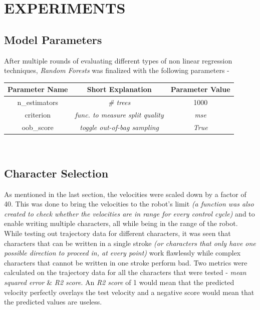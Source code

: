 \documentclass[a4paper]{article}
\begin{document}
\bigskip

\section{EXPERIMENTS}
\subsection{Model Parameters}
After multiple rounds of evaluating different types of non linear regression techniques, {\it Random Forests} was finalized with the following parameters -
\\
\begin{center}
 \begin{tabular}{| c | c | c |} 
 \hline
 \textbf{Parameter Name} & \textbf{Short Explanation} & \textbf{Parameter Value} \\ [0.5ex] 
 \hline
 n\_estimators & {\it \# trees} & 1000  \\ 
 \hline
 criterion & {\it func. to measure split quality} & {\it mse} \\
 \hline
 oob\_score & {\it toggle out-of-bag sampling} & {\it True} \\
[0.5ex] 
 \hline
\end{tabular}
\end{center}
\\
\subsection{Character Selection}
As mentioned in the last section, the velocities were scaled down by a factor of 40. This was done to bring the velocities to the robot's limit {\it (a function was also created to check whether the velocities are in range for every control cycle)} and to enable writing multiple characters, all while being in the range of the robot.\\

While testing out trajectory data for different characters, it was seen that characters that can be written in a single stroke {\it(or characters that only have one possible direction to proceed in, at every point)} work flawlessly while complex characters that cannot be written in one stroke perform bad. Two metrics were calculated on the trajectory data for all the characters that were tested - {\it mean squared error} \& {\it R2 score}. An {\it R2 score} of 1 would mean that the predicted velocity perfectly overlays the test velocity and a negative score would mean that the predicted values are useless.\\
\end{document}
